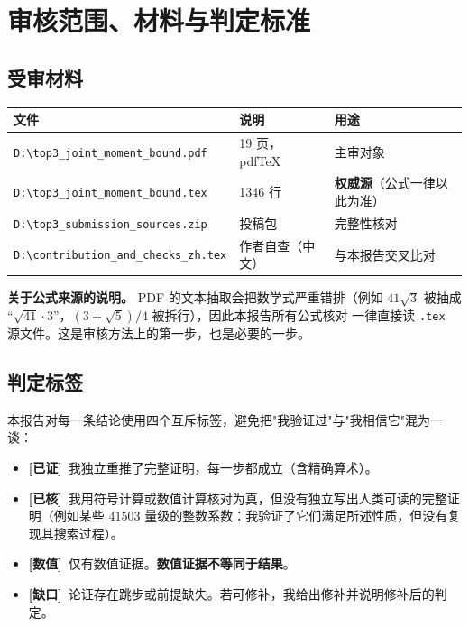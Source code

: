 \documentclass[UTF8,11pt]{ctexart}
\theoremstyle{definition}
\newcommand{\ok}{\textcolor[rgb]{0.05,0.45,0.15}{\bfseries [已证]}}
\newcommand{\chk}{\textcolor[rgb]{0.05,0.25,0.55}{\bfseries [已核]}}
\newcommand{\gap}{\textcolor[rgb]{0.70,0.15,0.10}{\bfseries [缺口]}}
\newcommand{\num}{\textcolor[rgb]{0.55,0.35,0.00}{\bfseries [数值]}}
\begin{document}
\section{审核范围、材料与判定标准}\label{sec:scope}

\subsection{受审材料}
\begin{center}
\begin{tabular}{lll}
\toprule
文件 & 说明 & 用途\\
\midrule
\texttt{D:\textbackslash top3\_joint\_moment\_bound.pdf} & 19 页，pdfTeX & 主审对象\\
\texttt{D:\textbackslash top3\_joint\_moment\_bound.tex} & 1346 行 & \textbf{权威源}（公式一律以此为准）\\
\texttt{D:\textbackslash top3\_submission\_sources.zip} & 投稿包 & 完整性核对\\
\texttt{D:\textbackslash contribution\_and\_checks\_zh.tex} & 作者自查（中文） & 与本报告交叉比对\\
\bottomrule
\end{tabular}
\end{center}

\noindent\textbf{关于公式来源的说明。} PDF 的文本抽取会把数学式严重错排（例如
$41\sqrt3$ 被抽成 ``$\sqrt{41}\cdot3$''，$(3+\sqrt5)/4$ 被拆行），因此本报告所有公式核对
一律直接读 \texttt{.tex} 源文件。这是审核方法上的第一步，也是必要的一步。

\subsection{判定标签}
本报告对每一条结论使用四个互斥标签，避免把"我验证过"与"我相信它"混为一谈：
\begin{itemize}[leftmargin=1.6em,itemsep=1pt]
\item \ok\ 我独立重推了完整证明，每一步都成立（含精确算术）。
\item \chk\ 我用符号计算或数值计算核对为真，但没有独立写出人类可读的完整证明（例如某些
$41503$ 量级的整数系数：我验证了它们满足所述性质，但没有复现其搜索过程）。
\item \num\ 仅有数值证据。\textbf{数值证据不等同于结果}。
\item \gap\ 论证存在跳步或前提缺失。若可修补，我给出修补并说明修补后的判定。
\end{itemize}
\end{document}
